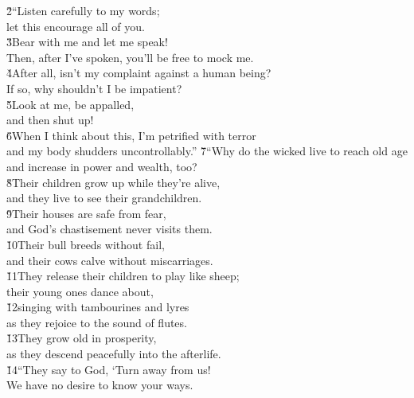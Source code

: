 \begin{poetry}
\poeml \v{2}``Listen carefully to my words; \\
\poemll    let this encourage all of you. \\
\poeml \v{3}Bear with me and let me speak! \\
\poemll    Then, after I've spoken, you'll be free to mock me. \\
\poeml \v{4}After all, isn't my complaint against a human being? \\
\poemll    If so, why shouldn't I be impatient? \\
\poeml \v{5}Look at me, be appalled, \\
\poemll    and then shut up! \\
\poeml \v{6}When I think about this, I'm petrified with terror \\
\poemll    and my body shudders uncontrollably.''
\poeml \v{7}``Why do the wicked live to reach old age \\
\poemll    and increase in power and wealth, too? \\
\poeml \v{8}Their children grow up while they're alive, \\
\poemll    and they live to see their grandchildren. \\
\poeml \v{9}Their houses are safe from fear, \\
\poemll    and God's chastisement never visits them. \\
\poeml \v{10}Their bull breeds without fail, \\
\poemll    and their cows calve without miscarriages. \\
\poeml \v{11}They release their children to play like sheep; \\
\poemll    their young ones dance about, \\
\poeml \v{12}singing with tambourines and lyres \\
\poemll    as they rejoice to the sound of flutes. \\
\poeml \v{13}They grow old in prosperity, \\
\poemll    as they descend peacefully into the afterlife. \\
\poeml \v{14}``They say to God, `Turn away from us! \\
\poemll    We have no desire to know your ways. \\

\end{poetry}
